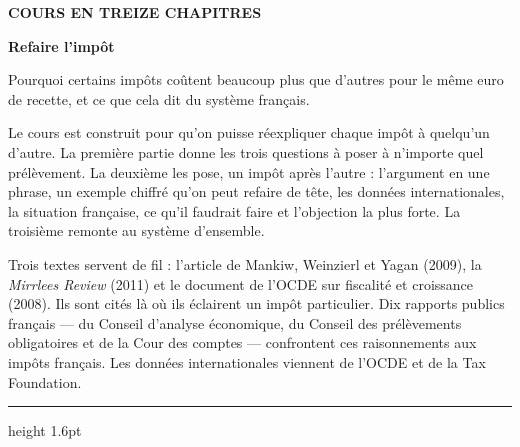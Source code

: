 \documentclass[11pt,a4paper]{article}
\begin{document}
\addto\captionsfrench{\renewcommand{\figurename}{Figure}%
  \renewcommand{\tablename}{Tableau}}
\renewcommand{\figurename}{Figure}\renewcommand{\tablename}{Tableau}

\thispagestyle{empty}
\vspace*{1.2cm}
{\footnotesize\color{ocre}\bfseries COURS EN TREIZE CHAPITRES\par}
\vspace{10pt}
{\fontsize{30}{34}\selectfont\bfseries Refaire l'impôt\par}
\vspace{14pt}
{\large Pourquoi certains impôts coûtent beaucoup plus que d'autres pour le même euro de recette,
et ce que cela dit du système français.\par}
\vspace{12pt}
{\small\color{encre}Le cours est construit pour qu'on puisse réexpliquer chaque impôt à
quelqu'un d'autre. La première partie donne les trois questions à poser à n'importe quel
prélèvement. La deuxième les pose, un impôt après l'autre : l'argument en une phrase, un exemple
chiffré qu'on peut refaire de tête, les données internationales, la situation française, ce
qu'il faudrait faire et l'objection la plus forte. La troisième remonte au système d'ensemble.\par}
\vspace{12pt}
{\small\color{encre}Trois textes servent de fil : l'article de Mankiw, Weinzierl et Yagan (2009),
la \emph{Mirrlees Review} (2011) et le document de l'OCDE sur fiscalité et croissance (2008). Ils
sont cités là où ils éclairent un impôt particulier. Dix rapports publics français --- du Conseil
d'analyse économique, du Conseil des prélèvements obligatoires et de la Cour des comptes ---
confrontent ces raisonnements aux impôts français. Les données internationales viennent de l'OCDE
et de la Tax Foundation.\par}
\vspace{18pt}
{\color{bleu}\hrule height 1.6pt}

\clearpage
\thispagestyle{empty}
\vspace*{1.2cm}
\end{document}
